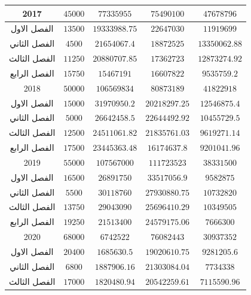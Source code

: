 \documentclass[10pt,a4paper]{report}
\begin{document}
\begin{longtable}{|c|c|c|c|c|}
	2017         & $45000$              & $77335955$       & $75490100$     & $47678796$         \\ \hline
	الفصل الاول  & $13500$              & $19333988.75$    & $22647030$     & $11919699$         \\ \hline
	الفصل الثاني & $4500$               & $21654067.4$     & $18872525$     & $13350062.88$      \\ \hline
	الفصل الثالث & $11250$              & $20880707.85$    & $17362723$     & $12873274.92$      \\ \hline
	الفصل الرابع & $15750$              & $15467191$       & $16607822$     & $9535759.2$        \\ \hline
	2018         & $50000$              & $106569834$      & $80873189$     & $41822918$         \\ \hline
	الفصل الاول  & $15000$              & $31970950.2$     & $20218297.25$  & $12546875.4$       \\ \hline
	الفصل الثاني & $5000$               & $26642458.5$     & $22644492.92$  & $10455729.5$       \\ \hline
	الفصل الثالث & $12500$              & $24511061.82$    & $21835761.03$  & $9619271.14$       \\ \hline
	الفصل الرابع & $17500$              & $23445363.48$    & $16174637.8$   & $9201041.96$       \\ \hline
	2019         & $55000$              & $107567000$      & $111723523$    & $38331500$         \\ \hline
	الفصل الاول  & $16500$              & $26891750$       & $33517056.9$   & $9582875$          \\ \hline
	الفصل الثاني & $5500$               & $30118760$       & $27930880.75$  & $10732820$         \\ \hline
	الفصل الثالث & $13750$              & $29043090$       & $25696410.29$  & $10349505$         \\ \hline
	الفصل الرابع & $19250$              & $21513400$       & $24579175.06$  & $7666300$          \\ \hline
	2020         & $68000$              & $6742522$        & $76082443$     & $30937352$         \\ \hline
	الفصل الاول  & $20400$              & $1685630.5$      & $19020610.75$  & $9281205.6$        \\ \hline
	الفصل الثاني & $6800$               & $1887906.16$     & $21303084.04$  & $7734338$          \\ \hline
	الفصل الثالث & $17000$              & $1820480.94$     & $20542259.61$  & $7115590.96$       \\ \hline

\end{longtable}
\end{document}

